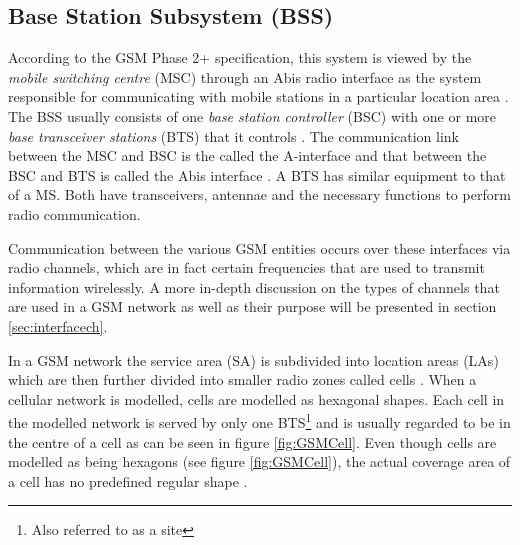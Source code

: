 \subsection{Base Station Subsystem (BSS)}

According to the GSM Phase 2+ specification, this system is viewed by the \emph{mobile switching centre} (MSC) through an Abis radio interface as the system responsible for communicating with mobile stations in a particular location area \cite{Eisenblatter}. The BSS usually consists of one \emph{base station controller} (BSC) with one or more \emph{base transceiver stations} (BTS) that it controls \cite{Eisenblatter}. The communication link between the MSC and BSC is the called the A-interface and that between the BSC and BTS is called the Abis interface \cite{Eisenblatter}. A BTS has similar equipment to that of a MS\cite{GSMSysEngin}. Both have transceivers, antennae and the necessary functions to perform radio communication. 

Communication between the various GSM entities occurs over these interfaces via radio channels, which are in fact certain frequencies that are used to transmit information wirelessly. A more in-depth discussion on the types of channels that are used in a GSM network as well as their purpose will be presented in section \ref{sec:interfacech}.

In a GSM network the service area (SA) is subdivided into location areas (LAs) which are then further divided into smaller radio zones called cells \cite{GSMSecurInTeleNetwork}. When a cellular network is modelled, cells are modelled as hexagonal shapes. Each cell in the modelled network is served by only one BTS\footnote{Also referred to as a site} and is usually regarded to be in the centre of a cell as can be seen in figure \ref{fig:GSMCell}\cite{GSMArchitectureProtocolsServices}. Even though cells are modelled as being hexagons (see figure \ref{fig:GSMCell}), the actual coverage area of a cell has no predefined regular shape \cite{GSMArchitectureProtocolsServices}.

